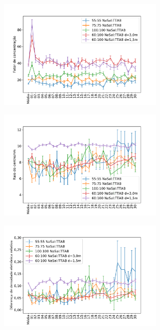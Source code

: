 	\begin{figure}
		\centering
		\includegraphics[width=0.7\textwidth]{imagens/saxs/param_nu_rpa}
		\caption{}
		\label{fig:param_nurpa}
	\end{figure}

	\begin{figure}
		\centering
		\includegraphics[width=0.7\textwidth]{imagens/saxs/param_rad_core}
		\caption{}
		\label{fig:param_radcore}
	\end{figure}

	\begin{figure}
		\centering
		\includegraphics[width=0.7\textwidth]{imagens/saxs/param_rho_rel}
		\caption{}
		\label{fig:param_rhorel}
	\end{figure}
	
